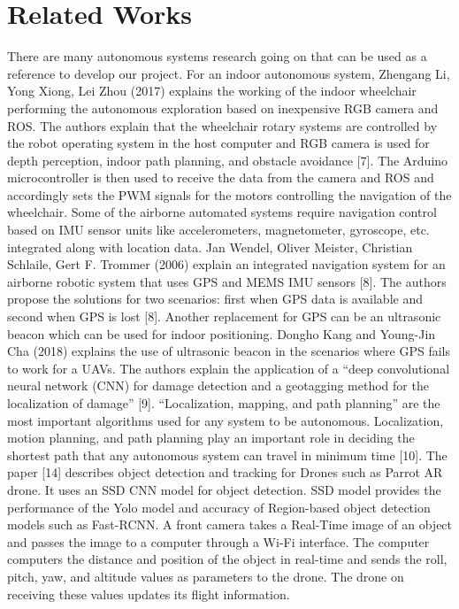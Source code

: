 \documentclass{IEEEtran}
\begin{document}
\section{Related Works}\label{sec:related}
There are many autonomous systems research going on that can be used as a reference to develop our project. For an indoor autonomous system, Zhengang Li, Yong Xiong, Lei Zhou (2017) explains the working of the indoor wheelchair performing the autonomous exploration based on inexpensive RGB camera and ROS. The authors explain that the wheelchair rotary systems are controlled by the robot operating system in the host computer and RGB camera is used for depth perception, indoor path planning, and obstacle avoidance [7]. The Arduino microcontroller is then used to receive the data from the camera and ROS and accordingly sets the PWM signals for the motors controlling the navigation of the wheelchair.
\newline Some of the airborne automated systems require navigation control based on IMU sensor units like accelerometers, magnetometer, gyroscope, etc. integrated along with location data. Jan Wendel, Oliver Meister, Christian Schlaile, Gert F. Trommer (2006) explain an integrated navigation system for an airborne robotic system that uses GPS and MEMS IMU sensors [8]. The authors propose the solutions for two scenarios: first when GPS data is available and second when GPS is lost [8]. Another replacement for GPS can be an ultrasonic beacon which can be used for indoor positioning. Dongho Kang and Young-Jin Cha (2018) explains the use of ultrasonic beacon in the scenarios where GPS fails to work for a UAVs. The authors explain the application of a “deep convolutional neural network (CNN) for damage detection and a geotagging method for the localization of damage” [9]. “Localization, mapping, and path planning” are the most important algorithms used for any system to be autonomous. Localization, motion planning, and path planning play an important role in deciding the shortest path that any autonomous system can travel in minimum time [10].
\newline The paper [14] describes object detection and tracking for Drones such as Parrot AR drone. It uses an SSD CNN model for object detection. SSD model provides the performance of the Yolo model and accuracy of Region-based object detection models such as Fast-RCNN. A front camera takes a Real-Time image of an object and passes the image to a computer through a Wi-Fi interface. The computer computers the distance and position of the object in real-time and sends the roll, pitch, yaw, and altitude values as parameters to the drone. The drone on receiving these values updates its flight information.
\end{document}
